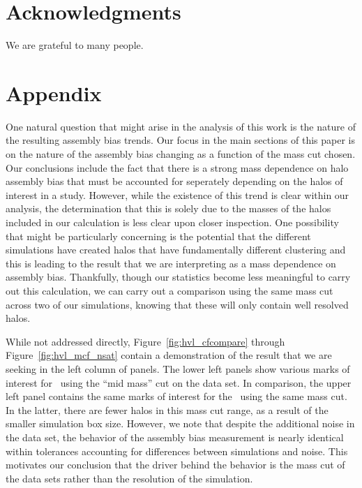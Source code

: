 \documentclass[usenatbib,usegraphicx,letterpaper]{mn2e}
\begin{document}
\section*{Acknowledgments}

We are grateful to many people.



\section*{Appendix}
\label{section:appendix_massres}

One natural question that might arise in the analysis of this work is the nature of the resulting assembly bias trends. Our focus in the main sections of this paper is on the nature of the assembly bias changing as a function of the mass cut chosen. Our conclusions include the fact that there is a strong mass dependence on halo assembly bias that must be accounted for seperately depending on the halos of interest in a study. However, while the existence of this trend is clear within our analysis, the determination that this is solely due to the masses of the halos included in our calculation is less clear upon closer inspection. One possibility that might be particularly concerning is the potential that the different simulations have created halos that have fundamentally different clustering and this is leading to the result that we are interpreting as a mass dependence on assembly bias. Thankfully, though our statistics become less meaningful to carry out this calculation, we can carry out a comparison using the same mass cut across two of our simulations, knowing that these will only contain well resolved halos.

While not addressed directly, Figure~\ref{fig:hvl_cfcompare} through Figure~\ref{fig:hvl_mcf_nsat} contain a demonstration of the result that we are seeking in the left column of panels. The lower left panels show various marks of interest for \simB \ using the ``mid mass'' cut on the data set. In comparison, the upper left panel contains the same marks of interest for the \simA \ using the same mass cut. In the latter, there are fewer halos in this mass cut range, as a result of the smaller simulation box size. However, we note that despite the additional noise in the data set, the behavior of the assembly bias measurement is nearly identical within tolerances accounting for differences between simulations and noise. This motivates our conclusion that the driver behind the behavior is the mass cut of the data sets rather than the resolution of the simulation.

\label{lastpage}
\end{document}
